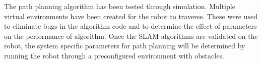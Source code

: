 \documentclass[class=article, crop=false]{standalone}
\begin{document}
	The path planning algorithm has been tested through simulation. Multiple virtual environments have been created for the robot to traverse. These were used to eliminate bugs in the algorithm code and to determine the effect of parameters on the performance of algorithm. Once the SLAM algorithms are validated on the robot, the system specific parameters for path planning will be determined by running the robot through a preconfigured environment with obstacles.


		
	
			
	
	
\end{document}
